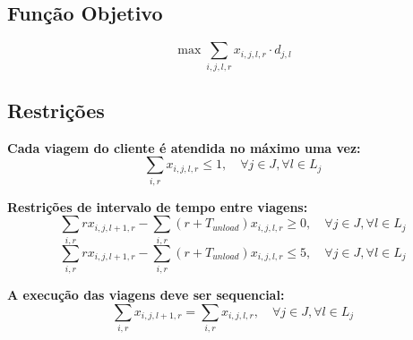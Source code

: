 

\subsection*{Função Objetivo}
\begin{equation}
    \max \sum_{i,j,l,r} x_{i,j,l,r} \cdot d_{j,l}
\end{equation}

\subsection*{Restrições}

\textbf{Cada viagem do cliente é atendida no máximo uma vez:}
\begin{equation}
    \sum_{i,r} x_{i,j,l,r} \leq 1, \quad \forall j \in J, \forall l \in L_j
\end{equation}

\textbf{Restrições de intervalo de tempo entre viagens:}
\begin{equation}
    \sum_{i,r} r x_{i,j,l+1,r} - \sum_{i,r} (r + T_{unload}) x_{i,j,l,r} \geq 0, \quad \forall j \in J, \forall l \in L_j
\end{equation}
\begin{equation}
    \sum_{i,r} r x_{i,j,l+1,r} - \sum_{i,r} (r + T_{unload}) x_{i,j,l,r} \leq 5, \quad \forall j \in J, \forall l \in L_j
\end{equation}

\textbf{A execução das viagens deve ser sequencial:}
\begin{equation}
    \sum_{i,r} x_{i,j,l+1,r} = \sum_{i,r} x_{i,j,l,r}, \quad \forall j \in J, \forall l \in L_j
\end{equation}

